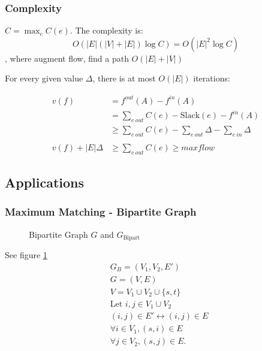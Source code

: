 \documentclass[a4paper]{report}
\begin{document}
\subsubsection{Complexity}
$C = \max_{e}C(e)$. The complexity is:
$$
O(|E|(|V|+|E|)\log C) = O(|E|^2 \log C)
$$
, where augment flow, find a path $O(|E|+|V|)$

For every given value $\Delta$, there is at most $O(|E|)$ iterations: 

\begin{align*}
v(f) &= f^{out}(A)-f^{in}(A) \\
&= \sum_{e~out}C(e)-\text{Slack}(e)-f^{in}(A) \\
&\geq \sum_{e~out}C(e)-\sum_{e~out}\Delta-\sum_{e~in}\Delta \\
\\
v(f)+|E|\Delta &\geq \sum_{e~out}C(e) \geq maxflow
\end{align*}

\subsection{Applications}
\subsubsection{Maximum Matching - Bipartite Graph}
\begin{figure}[!htp]
\centering
{}
\caption{Bipartite Graph $G$ and $G_\text{Bipart}$}
\label{fig:bipart}
\end{figure}
See figure \ref{fig:bipart}
\begin{align*}
& G_B = (V_1, V_2, E') \\
& G=(V, E) \\
& V= V_1 \cup V_2\cup \{s, t\}\\
& \text{Let } i, j \in V_1 \cup V_2\\
& (i,j)\in E' \leftrightarrow (i, j)\in E\\
& \forall i \in V_1, (s, i) \in E \\
& \forall j \in V_2, (s, j) \in E. 
\end{align*}
\end{document}
